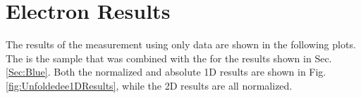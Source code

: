\chapter{Electron Results}
\label{app_glossary}
The results of the \phistar measurement using only  data are shown in the following plots. The  is the sample that was combined with the \xxbar{\mu}{\mu} for the results shown in Sec. \ref{Sec:Blue}. Both the normalized and absolute 1D results are shown in Fig. \ref{fig:Unfoldedee1DResults}, while the 2D results are all normalized. 

